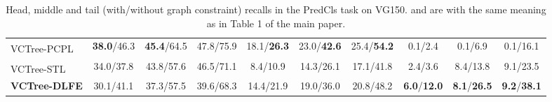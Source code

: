 \documentclass[sigconf]{acmart}
\begin{document}
\begin{table*}[htbp]
{\begin{tabular}{l|c c c|c c c|c c c}
VCTree-PCPL\textsuperscript{} \cite{yan2020pcpl} & \textbf{38.0}/46.3 & \textbf{45.4}/64.5 & 47.8/75.9 & 18.1/\textbf{26.3} & 23.0/\textbf{42.6} & 25.4/\textbf{54.2} & 0.1/2.4 & 0.1/6.9 & 0.1/16.1 \\
VCTree-STL\textsuperscript{} \cite{chen2019soft} & 34.0/37.8 & 43.8/57.6 & 46.5/71.1 & 8.4/10.9 & 14.3/26.1 & 17.1/41.8 & 2.4/3.6 & 8.4/13.8 & 9.1/23.5 \\
\textbf{VCTree-DLFE} & 30.1/41.1 & 37.3/57.5 & 39.6/68.3 & 14.4/21.9 & 19.0/36.0 & 20.8/48.2 & \textbf{6.0}/\textbf{12.0} & \textbf{8.1}/\textbf{26.5} & \textbf{9.2}/\textbf{38.1} \\
\hline
\end{tabular}
}
\vspace{0.1em}
\caption{Head, middle and tail (with/without graph constraint) recalls in the PredCls task on VG150.  and  are with the same meaning as in Table 1 of the main paper.
}
\label{tab:head_mid_tail_predcls}
\vspace{1em}
\end{table*}
\end{document}
